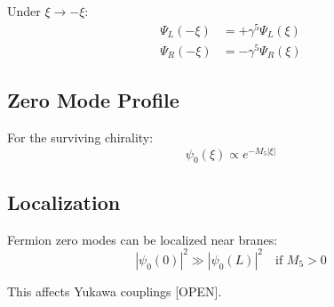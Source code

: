 \documentclass[11pt,a4paper]{article}
\begin{document}
Under $\xi \to -\xi$:
\begin{align}
  \Psi_L(-\xi) &= +\gamma^5 \Psi_L(\xi)
  \label{eq:app-psi-L} \\
  \Psi_R(-\xi) &= -\gamma^5 \Psi_R(\xi)
  \label{eq:app-psi-R}
\end{align}

\subsection{Zero Mode Profile}

For the surviving chirality:
\begin{equation}
  \psi_0(\xi) \propto e^{-M_5 |\xi|}
  \label{eq:app-fermion-profile}
\end{equation}

\subsection{Localization}

Fermion zero modes can be localized near branes:
\begin{equation}
  |\psi_0(0)|^2 \gg |\psi_0(L)|^2 \quad \text{if } M_5 > 0
  \label{eq:app-fermion-localization}
\end{equation}

This affects Yukawa couplings [OPEN].
\end{document}

